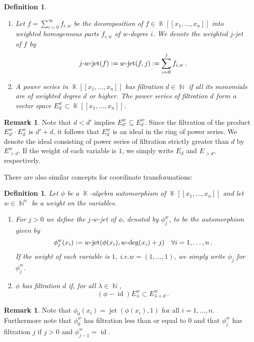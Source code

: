 \documentclass[noend]{amsproc}
\newtheorem{defn}[theorem]{Definition}
\theoremstyle{definition}
\newtheorem{remark}[theorem]{Remark}
\DeclareMathOperator{\N}{\mathbb{N}}
\DeclareMathOperator{\K}{\mathbb{K}}
\DeclareMathOperator{\id}{id}
\DeclareMathOperator{\dash}{\!\textnormal{-}\!}
\DeclareMathOperator{\jet}{jet}
\begin{document}
\begin{defn}
\leavevmode
\begin{enumerate}
\item
Let $f = \sum_{i = 0}^{\infty} f_{i,w}$ be the decomposition of
$f \in \K[[x_1,\ldots,x_n]]$ into weighted homogeneous parts $f_{i,w}$ of
$w$-degree $i$. We denote the weighted $j$-jet of $f$ by
\[
j \dash w \dash \jet(f) := w \dash \jet(f, j) := \sum_{i = 0}^j f_{i,w} \,.
\]

\item
A power series in $\K[[x_1,\ldots,x_n]]$ has filtration $d \in \N$ if all its
monomials are of weighted degree $d$ or higher. The power series of filtration
$d$ form a vector space $E_d^w \subset \K[[x_1,\ldots,x_n]]$.
\end{enumerate}
\end{defn}

\begin{remark}
Note that $d < d'$ implies $E_{d'}^w \subseteq E_d^w$. Since the filtration of
the product $E_{d'}^w \cdot E_d^w$ is $d'+d$, it follows that $E_d^w$ is an
ideal in the ring of power series. We denote the ideal consisting of power
series of filtration strictly greater than $d$ by $E_{>d}^w$. If the weight
of each variable is $1$, we simply write $E_d$ and $E_{>d}$, respectively.
\end{remark}

There are also similar concepts for coordinate transformations:

\begin{defn}\label{def:jet_phi}
Let $\phi$ be a $\K$-algebra automorphism of $\K[[x_1,\ldots,x_n]]$ and let
$w \in \N^n$ be a weight on the variables.

\begin{enumerate}
\item
For $j > 0$ we define the \emph{$j$-$w$-jet} of $\phi$, denoted by $\phi_j^w$,
to be the automorphism given by
\[
\phi_j^w(x_i) := w\dash\jet(\phi(x_i),w\dash\deg(x_i)+j) \quad
\forall i = 1,\ldots,n \,.
\]
If the weight of each variable is $1$, i.e.\@ $w = (1, \ldots, 1)$, we simply
write $\phi_j$ for $\phi_j^w$.

\item\label{enum:filtration}
$\phi$ has filtration $d$ if, for all $\lambda \in \N$,
\[
(\phi-\id)E_\lambda^w \subset E_{\lambda+d}^w \,.
\]
\end{enumerate}
\end{defn}

\begin{remark}
Note that $\phi_0(x_i) = \jet(\phi(x_i), 1)$ for all $i = 1, \ldots, n$.
Furthermore note that $\phi_0^w$ has filtration less than or equal to $0$ and
that $\phi_j^w$ has filtration $j$ if $j > 0$ and $\phi_{j-1}^w = \id$.
\end{remark}
\end{document}
